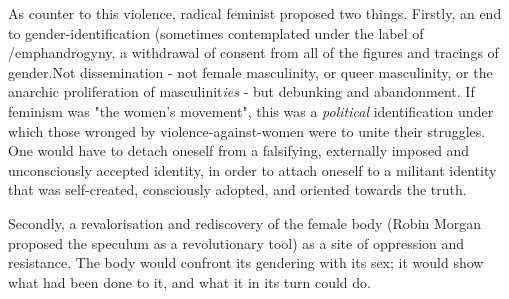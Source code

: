 \documentclass[ebook]{memoir}
\begin{document}
As counter to this violence, radical feminist proposed two things. Firstly, an end to gender-identification (sometimes contemplated under the label of /emph{androgyny}, a withdrawal of consent from all of the figures and tracings of gender.Not dissemination - not female masculinity, or queer masculinity, or the anarchic proliferation of masculinit\emph{ies} - but debunking and abandonment. If feminism was "the women's movement", this was a \emph{political} identification under which those wronged by violence-against-women were to unite their struggles. One would have to detach oneself from a falsifying, externally imposed and unconsciously accepted identity, in order to attach oneself to a militant identity that was self-created, consciously adopted, and oriented towards the truth.

Secondly, a revalorisation and rediscovery of the female body (Robin Morgan proposed the speculum as a revolutionary tool) as a site of oppression and resistance. The body would confront its gendering with its sex; it would show what had been done to it, and what it in its turn could do.
\end{document}
